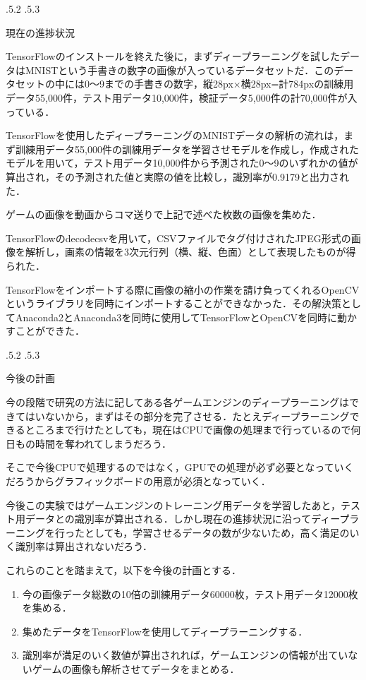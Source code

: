 \documentclass[uplatex]{jsarticle}
\makeatletter
\renewcommand{\section}{%
    \if@slide\clearpage\fi
    \@startsection{section}{1}{\z@}%
    {\Cvs \@plus.5\Cdp \@minus.2\Cdp}%
    {.5\Cvs \@plus.3\Cdp}%
    {\normalfont\raggedright}}
\makeatother
\begin{document}
\section{現在の進捗状況}

TensorFlowのインストールを終えた後に，まずディープラーニングを試したデータはMNISTという手書きの数字の画像が入っているデータセットだ．このデータセットの中には0～9までの手書きの数字，縦28px×横28px=計784pxの訓練用データ55,000件，テスト用データ10,000件，検証データ5,000件の計70,000件が入っている．

TensorFlowを使用したディープラーニングのMNISTデータの解析の流れは，まず訓練用データ55,000件の訓練用データを学習させモデルを作成し，作成されたモデルを用いて，テスト用データ10,000件から予測された0～9のいずれかの値が算出され，その予測された値と実際の値を比較し，識別率が0.9179と出力された．

ゲームの画像を動画からコマ送りで上記で述べた枚数の画像を集めた．

TensorFlowのdecodecsvを用いて，CSVファイルでタグ付けされたJPEG形式の画像を解析し，画素の情報を3次元行列（横、縦、色面）として表現したものが得られた．

TensorFlowをインポートする際に画像の縮小の作業を請け負ってくれるOpenCVというライブラリを同時にインポートすることができなかった．その解決策としてAnaconda2とAnaconda3を同時に使用してTensorFlowとOpenCVを同時に動かすことができた．

\section{今後の計画}

今の段階で研究の方法に記してある各ゲームエンジンのディープラーニングはできてはいないから，まずはその部分を完了させる．たとえディープラーニングできるところまで行けたとしても，現在はCPUで画像の処理まで行っているので何日もの時間を奪われてしまうだろう．

そこで今後CPUで処理するのではなく，GPUでの処理が必ず必要となっていくだろうからグラフィックボードの用意が必須となっていく．

今後この実験ではゲームエンジンのトレーニング用データを学習したあと，テスト用データとの識別率が算出される．しかし現在の進捗状況に沿ってディープラーニングを行ったとしても，学習させるデータの数が少ないため，高く満足のいく識別率は算出されないだろう．

これらのことを踏まえて，以下を今後の計画とする．

\begin{enumerate}
\item 今の画像データ総数の10倍の訓練用データ60000枚，テスト用データ12000枚を集める．
\item 集めたデータをTensorFlowを使用してディープラーニングする．
\item 識別率が満足のいく数値が算出されれば，ゲームエンジンの情報が出ていないゲームの画像も解析させてデータをまとめる．
\end{enumerate}



\end{document}
